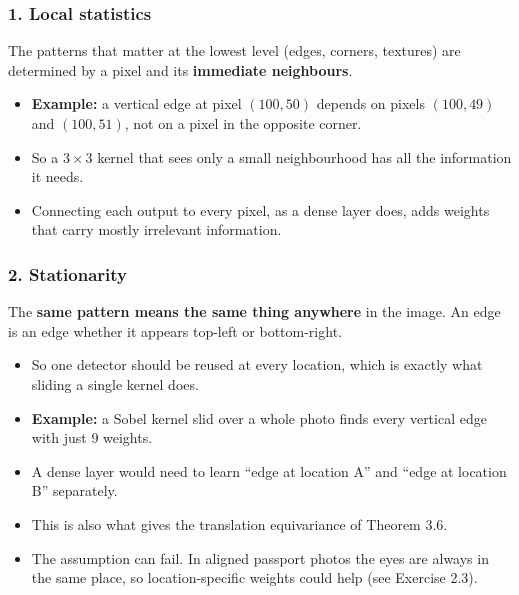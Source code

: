 \subsubsection*{1. Local statistics}
The patterns that matter at the lowest level (edges, corners, textures) are determined by a pixel and its \textbf{immediate neighbours}.
\begin{itemize}
  \item \textbf{Example:} a vertical edge at pixel $(100, 50)$ depends on pixels $(100, 49)$ and $(100, 51)$, not on a pixel in the opposite corner.
  \item So a $3 \times 3$ kernel that sees only a small neighbourhood has all the information it needs.
  \item Connecting each output to every pixel, as a dense layer does, adds weights that carry mostly irrelevant information.
\end{itemize}

\subsubsection*{2. Stationarity}
The \textbf{same pattern means the same thing anywhere} in the image. An edge is an edge whether it appears top-left or bottom-right.
\begin{itemize}
  \item So one detector should be reused at every location, which is exactly what sliding a single kernel does.
  \item \textbf{Example:} a Sobel kernel slid over a whole photo finds every vertical edge with just 9 weights.
  \item A dense layer would need to learn ``edge at location A'' and ``edge at location B'' separately.
  \item This is also what gives the translation equivariance of Theorem 3.6.
  \item The assumption can fail. In aligned passport photos the eyes are always in the same place, so location-specific weights could help (see Exercise 2.3).
\end{itemize}


